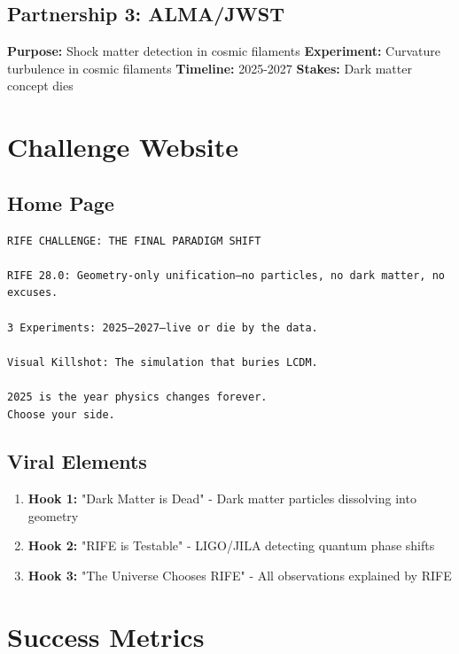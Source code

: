 \documentclass[11pt]{report}
\begin{document}
\subsection{Partnership 3: ALMA/JWST}
\textbf{Purpose:} Shock matter detection in cosmic filaments
\textbf{Experiment:} Curvature turbulence in cosmic filaments
\textbf{Timeline:} 2025-2027
\textbf{Stakes:} Dark matter concept dies

\section{Challenge Website}

\subsection{Home Page}
\begin{verbatim}
RIFE CHALLENGE: THE FINAL PARADIGM SHIFT

RIFE 28.0: Geometry-only unification—no particles, no dark matter, no excuses.

3 Experiments: 2025–2027—live or die by the data.

Visual Killshot: The simulation that buries LCDM.

2025 is the year physics changes forever.
Choose your side.
\end{verbatim}

\subsection{Viral Elements}
\begin{enumerate}
\item \textbf{Hook 1:} "Dark Matter is Dead" - Dark matter particles dissolving into geometry
\item \textbf{Hook 2:} "RIFE is Testable" - LIGO/JILA detecting quantum phase shifts
\item \textbf{Hook 3:} "The Universe Chooses RIFE" - All observations explained by RIFE
\end{enumerate}

\section{Success Metrics}
\end{document}
